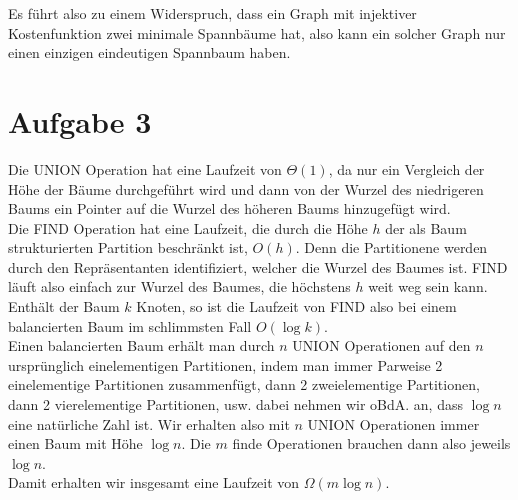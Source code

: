 \documentclass[a4paper,11pt]{article}
\begin{document}
Es führt also zu einem Widerspruch, dass ein Graph mit injektiver Kostenfunktion zwei minimale Spannbäume hat, also kann ein solcher Graph nur einen einzigen eindeutigen Spannbaum haben.

\section*{Aufgabe 3}

Die UNION Operation hat eine Laufzeit von $\Theta(1)$, da nur ein Vergleich der Höhe der Bäume durchgeführt wird und dann von der Wurzel des niedrigeren Baums ein Pointer auf die Wurzel des höheren Baums hinzugefügt wird.\\

Die FIND Operation hat eine Laufzeit, die durch die Höhe $h$ der als Baum strukturierten Partition beschränkt ist, $O(h)$. Denn die Partitionene werden durch den Repräsentanten identifiziert, welcher die Wurzel des Baumes ist. FIND läuft also einfach zur Wurzel des Baumes, die höchstens $h$ weit weg sein kann. Enthält der Baum $k$ Knoten, so ist die Laufzeit von FIND also bei einem balancierten Baum im schlimmsten Fall $O(\log k)$.\\

Einen balancierten Baum erhält man durch $n$ UNION Operationen auf den $n$ ursprünglich einelementigen Partitionen, indem man immer Parweise 2 einelementige Partitionen zusammenfügt, dann 2 zweielementige Partitionen, dann 2 vierelementige Partitionen, usw. dabei nehmen wir oBdA. an, dass $\log n$ eine natürliche Zahl ist. Wir erhalten also mit $n$ UNION Operationen immer einen Baum mit Höhe $\log n$. Die $m$ finde Operationen brauchen dann also jeweils $\log n$.\\

Damit erhalten wir insgesamt eine Laufzeit von $\Omega(m \log n)$.
\end{document}

